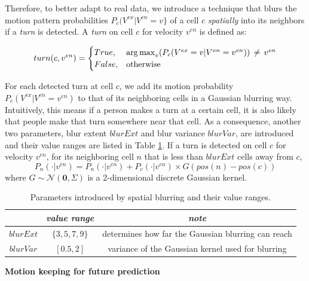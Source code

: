 Therefore, to better adapt to real data, we introduce a technique that blurs the motion pattern probabilities  \( P_c(V^{ex} | V^{en}=v\} \) of a cell $c$ \textit{spatially} into its neighbors if a \textit{turn} is detected. A \textit{turn} on cell $c$ for velocity $v^{en}$ is defined as:

\[ 
turn(c, v^{en}) = 
\begin{cases}
    True , &  \operatorname*{arg\,max}_v (P_c(V^{ex}=v | V^{en}=v^{en})) \, \neq \, v^{en} \\
    False,              & \text{otherwise}
\end{cases}
 \]


For each detected turn at cell $c$, we add its motion probability $P_c(V^{ex} | V^{en}=v^{en})$ to that of its neighboring cells in a Gaussian blurring way. Intuitively, this means if a person makes a turn at a certain cell, it is also likely that people make that turn somewhere near that cell. As a consequence, another two parameters, blur extent \( blurExt \) and blur variance  \( blurVar \), are introduced and their value ranges are listed in Table \ref{table:spatial_blur_param_range}. If a turn is detected on cell $c$ for velocity $v^{en}$, for its neighboring cell $n$ that is less than $blurExt$ cells away from $c$,
\begin{equation}
P_n(\cdot| v^{en}) = P_n(\cdot| v^{en})  + P_c(\cdot| v^{en}) \times G(pos(n)-pos(c))
\end{equation}
where $G \sim \mathcal{N}(\mathbf{0}, \Sigma)$ is a 2-dimensional discrete Gaussian kernel.
\begin{table}[H]
\centering  
\begin{tabularx}{.8\textwidth}{c|c|c}
    \hline
      &  \textit{value range } & \textit{note} \\ \hline
    \( blurExt \) & \( \{3, 5, 7, 9\} \) & \footnotesize{determines how far the Gaussian blurring can reach} \\
     \( blurVar \) & \( [0.5, 2]\) & \footnotesize{ variance of the Gaussian kernel used for blurring} \\   
   \hline
  \end{tabularx}
\caption{Parameters introduced by spatial blurring and their value ranges.}
\label{table:spatial_blur_param_range}
\end{table}

\newpage
\textbf{Motion keeping for future prediction}

